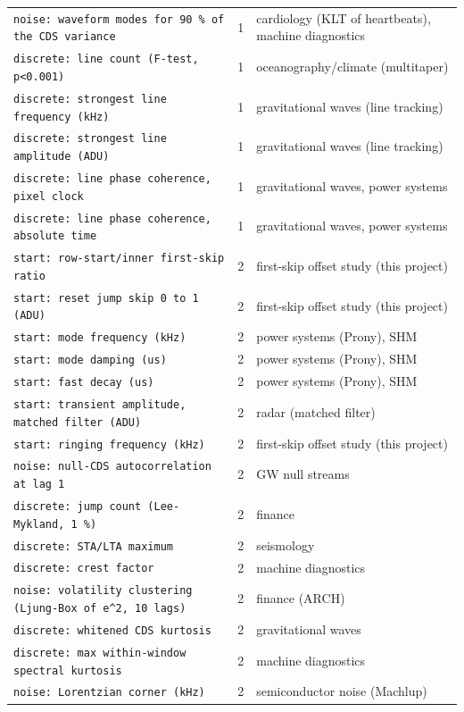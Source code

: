 \documentclass[10pt]{article}
\renewcommand{\_}{\oldunderscore\allowbreak}
\begin{document}
\begin{longtable}{>{\raggedright\arraybackslash}p{}c>{\raggedright\arraybackslash}p{}}
\texttt{noise: waveform modes for 90 \% of the CDS variance} & 1 & cardiology (KLT of heartbeats), machine diagnostics \\
\texttt{discrete: line count (F-test, p\textless{}0.001)} & 1 & oceanography/climate (multitaper) \\
\texttt{discrete: strongest line frequency (kHz)} & 1 & gravitational waves (line tracking) \\
\texttt{discrete: strongest line amplitude (ADU)} & 1 & gravitational waves (line tracking) \\
\texttt{discrete: line phase coherence, pixel clock} & 1 & gravitational waves, power systems \\
\texttt{discrete: line phase coherence, absolute time} & 1 & gravitational waves, power systems \\
\texttt{start: row-start/inner first-skip ratio} & 2 & first-skip offset study (this project) \\
\texttt{start: reset jump skip 0 to 1 (ADU)} & 2 & first-skip offset study (this project) \\
\texttt{start: mode frequency (kHz)} & 2 & power systems (Prony), SHM \\
\texttt{start: mode damping (us)} & 2 & power systems (Prony), SHM \\
\texttt{start: fast decay (us)} & 2 & power systems (Prony), SHM \\
\texttt{start: transient amplitude, matched filter (ADU)} & 2 & radar (matched filter) \\
\texttt{start: ringing frequency (kHz)} & 2 & first-skip offset study (this project) \\
\texttt{noise: null-CDS autocorrelation at lag 1} & 2 & GW null streams \\
\texttt{discrete: jump count (Lee-Mykland, 1 \%)} & 2 & finance \\
\texttt{discrete: STA/LTA maximum} & 2 & seismology \\
\texttt{discrete: crest factor} & 2 & machine diagnostics \\
\texttt{noise: volatility clustering (Ljung-Box of e\textasciicircum{}2, 10 lags)} & 2 & finance (ARCH) \\
\texttt{discrete: whitened CDS kurtosis} & 2 & gravitational waves \\
\texttt{discrete: max within-window spectral kurtosis} & 2 & machine diagnostics \\
\texttt{noise: Lorentzian corner (kHz)} & 2 & semiconductor noise (Machlup) \\

\end{longtable}
\end{document}
